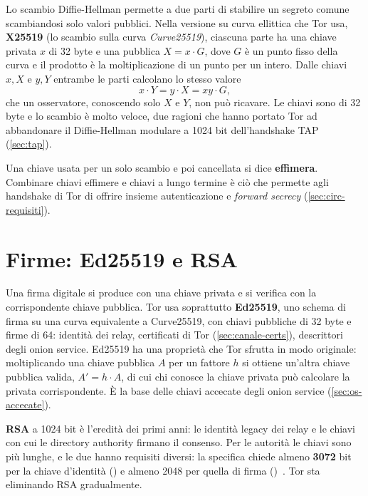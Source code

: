 Lo scambio Diffie-Hellman permette a due parti di stabilire un segreto comune scambiandosi solo valori pubblici. Nella versione su curva ellittica che Tor usa, \textbf{X25519} (lo scambio sulla curva \emph{Curve25519}), ciascuna parte ha una chiave privata $x$ di 32 byte e una pubblica $X = x \cdot G$, dove $G$ è un punto fisso della curva e il prodotto è la moltiplicazione di un punto per un intero. Dalle chiavi $x, X$ e $y, Y$ entrambe le parti calcolano lo stesso valore
\[ x \cdot Y = y \cdot X = xy \cdot G, \]
che un osservatore, conoscendo solo $X$ e $Y$, non può ricavare. Le chiavi sono di 32 byte e lo scambio è molto veloce, due ragioni che hanno portato Tor ad abbandonare il Diffie-Hellman modulare a 1024 bit dell'handshake TAP (\cref{sec:tap}).

Una chiave usata per un solo scambio e poi cancellata si dice \textbf{effimera}. Combinare chiavi effimere e chiavi a lungo termine è ciò che permette agli handshake di Tor di offrire insieme autenticazione e \emph{forward secrecy} (\cref{sec:circ-requisiti}).

\section{Firme: Ed25519 e RSA}\label{sec:cripto-firme}

Una firma digitale si produce con una chiave privata e si verifica con la corrispondente chiave pubblica. Tor usa soprattutto \textbf{Ed25519}, uno schema di firma su una curva equivalente a Curve25519, con chiavi pubbliche di 32 byte e firme di 64: identità dei relay, certificati di Tor (\cref{sec:canale-certs}), descrittori degli onion service. Ed25519 ha una proprietà che Tor sfrutta in modo originale: moltiplicando una chiave pubblica $A$ per un fattore $h$ si ottiene un'altra chiave pubblica valida, $A' = h \cdot A$, di cui chi conosce la chiave privata può calcolare la privata corrispondente. È la base delle chiavi accecate degli onion service (\cref{sec:os-accecate}).

\textbf{RSA} a 1024 bit è l'eredità dei primi anni: le identità legacy dei relay e le chiavi con cui le directory authority firmano il consenso. Per le autorità le chiavi sono più lunghe, e le due hanno requisiti diversi: la specifica chiede almeno \textbf{3072} bit per la chiave d'identità () e almeno 2048 per quella di firma ()~. Tor sta eliminando RSA gradualmente.

